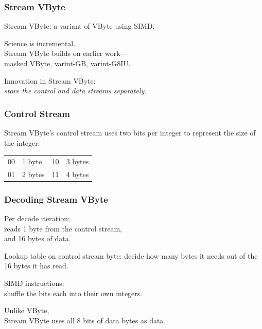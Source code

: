 \begin{frame}
\frametitle{Stream VByte}
\vspace*{-2em}

Stream VByte: a variant of VByte using SIMD.


Science is incremental. \\
Stream VByte builds on earlier work---\\
\hspace*{2em}masked VByte, {\sc varint}-GB, {\sc varint}-G8IU. 

Innovation in Stream VByte:\\
\hspace*{2em}\emph{store the control and data streams separately}.


\end{frame}

\begin{frame}
\frametitle{Control Stream}
\vspace*{-4em}

Stream VByte's control stream uses two bits per integer to represent the size of the integer:
\begin{center}
\vspace*{-3em}
\begin{tabular}{ll@{~~~~~~~~}ll}
00 & 1 byte & 10 & 3 bytes\\
01 & 2 bytes & 11 & 4 bytes
\end{tabular}
\end{center}


\end{frame}


\begin{frame}
\frametitle{Decoding Stream VByte}


Per decode iteration:\\
\hspace*{2em} reads 1 byte from the control stream,\\
\hspace*{2em} and 16 bytes of data.


Lookup table on control stream byte: decide how many
bytes it needs out of the 16 bytes it has read.

SIMD instructions: \\
\hspace*{2em}shuffle the bits each into their own integers. 

Unlike VByte, \\
Stream VByte uses all 8 bits
of data bytes as data.


\end{frame}



